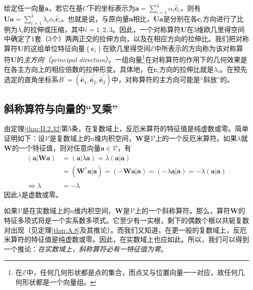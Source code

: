\documentclass[../main.tex]{subfiles}
\begin{document}
给定任一向量$\mathbf{a}$，若它在基$C$下的坐标表示为$\mathbf{a}=\sum_{i=1}^3\alpha_i\mathbf{\hat{c}}_i$，则有$\mathbf{Ua}=\sum_{i=1}^3\lambda_i\alpha_i\mathbf{\hat{c}}_i$。也就是说，与原向量$\mathbf{a}$相比，$\mathbf{Ua}$是分别在各$\mathbf{\hat{c}}_i$方向进行了比例为$\lambda_i$的拉伸或压缩，其中$i=1,2,3$。因此，一个对称算符$\mathbf{U}$在3维欧几里得空间中确定了1套（3个）两两正交的拉伸方向，以及在相应方向的拉伸比。我们把对称算符$\mathbf{U}$的这组单位特征向量$\left\{\mathbf{c}_i\right\}$在欧几里得空间$\mathcal{E}$中所表示的方向称为该对称算符$\mathbf{U}$的\emph{主方向（principal direction）}。一组向量\footnote{在$\mathcal{E}$中，任何几何形状都是点的集合，而点又与位置向量一一对应，故任何几何形状都是一个向量组。}在对称算符的作用下的几何效果是在各主方向上的相应倍数的拉伸形变。具体地，在$\mathbf{c}_i$方向的拉伸比就是$\lambda_i$。在预先选定的直角坐标系$B^\prime=\left(\mathbf{\hat{e}}^\prime_1,\mathbf{\hat{e}}^\prime_2,\mathbf{\hat{e}}^\prime_3\right)$中，对称算符的主方向可能是“斜放”的。

\subsection{斜称算符与向量的“叉乘”}\label{sec:II.3.3.3}
由定理\ref{thm:II.2.32}第5条，在复数域上，反厄米算符的特征值是纯虚数或零。简单证明如下：设$\mathcal{V}$是复数域上的$n$维内积空间，$\mathbf{W}$是$\mathcal{V}$上的一个反厄米算符。如果$\lambda$就$\mathbf{W}$的一个特征值，则对任意向量$\mathbf{a}\in\mathcal{V}$，有
\[\begin{aligned}
        \left(\mathbf{a}|\mathbf{Wa}\right) & =\left(\mathbf{a}|\lambda\mathbf{a}\right)=\overline{\lambda}\left(\mathbf{a}|\mathbf{a}\right)                                                                            \\
                                            & =\left(\mathbf{W}^*\mathbf{a}|\mathbf{a}\right)=\left(-\mathbf{Wa}|\mathbf{a}\right)=\left(-\lambda\mathbf{a}|\mathbf{a}\right)=-\lambda\left(\mathbf{a}|\mathbf{a}\right) \\
        \Leftrightarrow\lambda              & =-\overline{\lambda}
    \end{aligned}\]
因此$\lambda$是虚数或零。

如果$\mathcal{V}$是在实数域上的$n$维内积空间，$\mathbf{W}$是$\mathcal{V}$上的一个斜称算符。那么，算符$\mathbf{W}$的特征多项式将是一个实系数多项式。它至少有一实根，剩下的偶数个根以共轭复数对出现（见定理\ref{thm:A.8}及其推论）。而我们又知道，在更一般的复数域上，反厄米算符的特征值是纯虚数或零。因此，在实数域上也应如此。所以，我们可以得到一个推论：\emph{在实数域上，斜称算符必有一特征值为零}。
\end{document}
